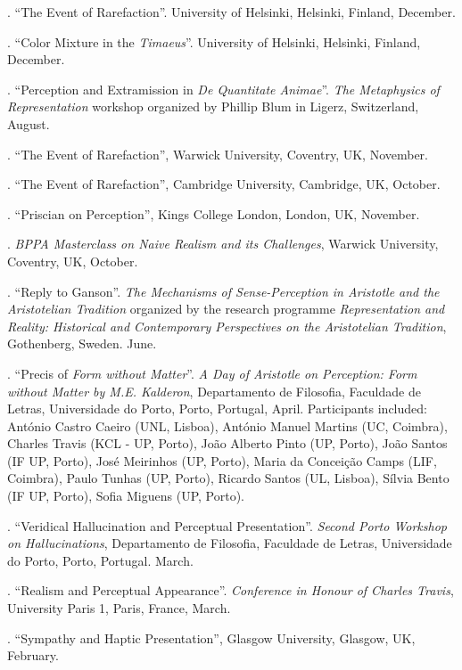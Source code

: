 \documentclass[11pt]{article}
\begin{document}
\medskip
{}. ``The Event of Rarefaction''. University of Helsinki, Helsinki, Finland, December.

. ``Color Mixture in the \emph{Timaeus}''. University of Helsinki, Helsinki, Finland, December.

. ``Perception and Extramission in \emph{De Quantitate Animae}''. \emph{The Metaphysics of Representation} workshop organized by Phillip Blum in Ligerz, Switzerland, August.

. ``The Event of Rarefaction'', Warwick University, Coventry, UK, November.

. ``The Event of Rarefaction'', Cambridge University, Cambridge, UK, October.

. ``Priscian on Perception'', Kings College London, London, UK, November.

. \emph{BPPA Masterclass on Naive Realism and its Challenges}, Warwick University, Coventry, UK, October.

. ``Reply to Ganson''. \emph{The Mechanisms of Sense-Perception in Aristotle and the Aristotelian Tradition} organized by the research programme
\emph{Representation and Reality: Historical and Contemporary Perspectives on the Aristotelian Tradition}, Gothenberg, Sweden. June.

. ``Precis of \emph{Form without Matter}''. \emph{A Day of Aristotle on Perception: Form without Matter by M.E. Kalderon}, Departamento de Filosofia, Faculdade de Letras, Universidade do Porto, Porto, Portugal, April. Participants included: António Castro Caeiro (UNL, Lisboa), António Manuel Martins (UC, Coimbra), Charles Travis (KCL - UP, Porto), João Alberto Pinto (UP, Porto), João Santos (IF UP, Porto), José Meirinhos (UP, Porto), Maria da Conceição Camps (LIF, Coimbra), Paulo Tunhas (UP, Porto), Ricardo Santos (UL, Lisboa), Sílvia Bento (IF UP, Porto), Sofia Miguens (UP, Porto).

. ``Veridical Hallucination and Perceptual Presentation''. \emph{Second Porto Workshop on Hallucinations}, Departamento de Filosofia, Faculdade de Letras, Universidade do Porto, Porto, Portugal. March.

. ``Realism and Perceptual Appearance''. \emph{Conference in Honour of Charles Travis}, University Paris 1, Paris, France, March.

. ``Sympathy and Haptic Presentation'', Glasgow University, Glasgow, UK, February.
\end{document}
